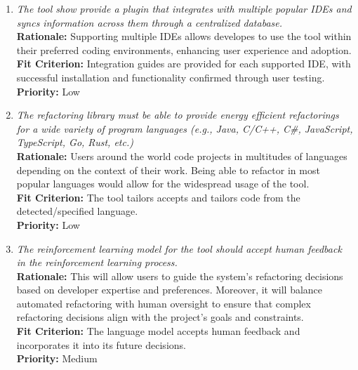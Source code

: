 \documentclass[12pt]{article}
\begin{document}
\begin{enumerate}[label=WTRM \arabic*., wide=0pt, leftmargin=*]
    {\bf Rationale:} This would help users better understand the impact of refactoring on both energy consumption and performance.\\
    {\bf Fit Criterion:} Users are able to access energy metrics for all their projects on a centralized platform.\\
    {\bf Priority:} High
  \item \emph{The tool show provide a plugin that integrates with multiple popular IDEs and syncs information across them through a centralized database.}\\
    {\bf Rationale:} Supporting multiple IDEs allows developes to use the tool within their preferred coding environments, enhancing user experience and adoption.\\
    {\bf Fit Criterion:} Integration guides are provided for each supported IDE, with successful installation and functionality confirmed through user testing.\\
    {\bf Priority:} Low
  \item \emph{The refactoring library must be able to provide energy efficient refactorings for a wide variety of program languages (e.g., Java, C/C++, C\#, JavaScript, TypeScript, Go, Rust, etc.)}\\
    {\bf Rationale:} Users around the world code projects in multitudes of languages depending on the context of their work. Being able to refactor in most popular languages would allow for the widespread usage of the tool.\\
    {\bf Fit Criterion:} The tool tailors accepts and tailors code from the detected/specified language.\\
    {\bf Priority:} Low
  \item \emph{The reinforcement learning model for the tool should accept human feedback in the reinforcement learning process.}\\
    {\bf Rationale:} This will allow users to guide the system's refactoring decisions based on developer expertise and preferences. Moreover, it will balance automated refactoring with human oversight to ensure that complex refactoring decisions align with the project's goals and constraints.\\
    {\bf Fit Criterion:} The language model accepts human feedback and incorporates it into its future decisions.\\
    {\bf Priority:} Medium
\end{enumerate}
\end{document}
